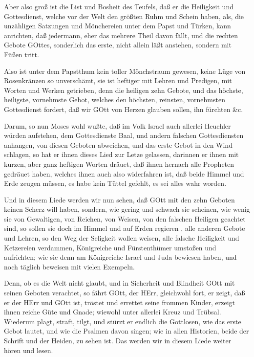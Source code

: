 Aber also groß ist die List und Bosheit des Teufels, daß er die Heiligkeit und Gottesdienst, welche vor der Welt den größten Ruhm und Schein haben, als, die unzähligen Satzungen und Mönchereien unter dem Papst und Türken, kann anrichten, daß jedermann, eher das mehrere Theil davon fällt, und die rechten Gebote GOttes, sonderlich das erste, nicht allein läßt anstehen, sondern mit Füßen tritt.

Also ist unter dem Papstthum kein toller Mönchstraum gewesen, keine Lüge von Rosenkränzen so unverschämt, sie ist heftiger mit Lehren und Predigen, mit Worten und Werken getrieben, denn die heiligen zehn Gebote, und das höchste, heiligste, vornehmste Gebot, welches den höchsten, reinsten, vornehmsten Gottesdienst fordert, daß wir GOtt von Herzen glauben sollen, ihn fürchten \&c.

Darum, so nun Moses wohl wußte, daß im Volk Israel auch allerlei Heuchler würden aufstehen, dem Gottesdienste Baal, und andern falschen Gottesdiensten anhangen, von diesen Geboten abweichen, und das erste Gebot in den Wind schlagen, so hat er ihnen dieses Lied zur Letze gelassen, darinnen er ihnen mit kurzen, aber ganz heftigen Worten dräuet, daß ihnen hernach alle Propheten gedräuet haben, welches ihnen auch also widerfahren ist, daß beide Himmel und Erde zeugen müssen, es habe kein Tüttel gefehlt, es sei alles wahr worden.

Und in diesem Liede werden wir nun sehen, daß GOtt mit den zehn Geboten keinen Scherz will haben, sondern, wie gering und schwach sie scheinen, wie wenig sie von Gewaltigen, von Reichen, von Weisen, von den falschen Heiligen geachtet sind, so sollen sie doch im Himmel und auf Erden regieren
, alle anderen Gebote und Lehren, so den Weg der Seligkeit wollen weisen, alle falsche Heiligkeit und Ketzereien verdammen, Königreiche und Fürstenthümer umstoßen und aufrichten; wie sie denn am Königreiche Israel und Juda bewiesen haben, und noch täglich beweisen mit vielen Exempeln.

Denn, ob es die Welt nicht glaubt, und in Sicherheit und Blindheit GOtt mit seinen Geboten verachtet, so fährt GOtt, der HErr, gleichwohl fort, er zeigt, daß er der HErr und GOtt ist, tröstet und errettet seine frommen Kinder, erzeigt ihnen reiche Güte und Gnade; wiewohl unter allerlei Kreuz und Trübsal. Wiederum plagt, straft, tilgt, und stürzt er endlich die Gottlosen, wie das erste Gebot lautet, und wie die Psalmen davon singen; wie in allen Historien, beide der Schrift und der Heiden, zu sehen ist. Das werden wir in diesem Liede weiter hören und lesen.

